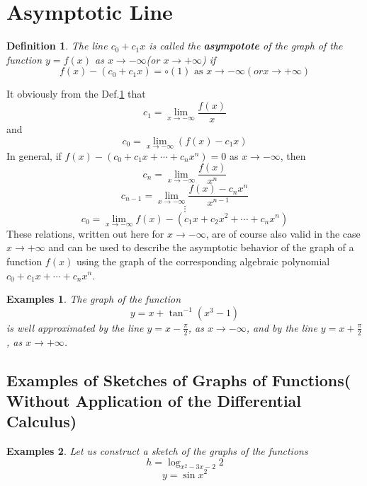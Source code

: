 \documentclass[a4paper,12pt]{article} %
\newtheorem{definition}{Definition}[section]
\newtheorem{example}{Examples}
\begin{document}
\section{Asymptotic Line}
\begin{definition}
    \normalfont 
    The line $c_0 + c_1x$ is called the \textbf{asympotote} of the graph of 
    the function $y = f(x)$ as $x \to -\infty$(or $x \to +\infty$) if 
    \[
        f(x) - (c_0 + c_1x) = \circ(1) \text{ as } x \to -\infty (or x \to +\infty)
        \]
    \label{def:def1}
\end{definition}
It obviously from the Def.\ref{def:def1} that 
\[
    c_1 = \lim_{x \to -\infty}\frac{f(x)}{x}
    \]
and 
\[
    c_0 = \lim_{x \to -\infty} \left(f(x) - c_1x\right)
    \]
In general, if $\displaystyle f(x) - (c_0 + c_1x + \cdots + c_nx^n) = 0$
as $x \to -\infty$, then 
\[
    c_n = \lim_{x \to -\infty}\frac{f(x)}{x^n}
    \]
\[
    c_{n-1} = \lim_{x \to -\infty} \frac{f(x) - c_nx^n}{x^{n-1}}
    \]
\[
    \vdots\]
\[
    c_0 = \lim_{x \to -\infty} f(x) - (c_1x + c_2x^2 + \cdots + c_nx^n)
    \]
These relations, written out here for $x \to -\infty$, are of course also 
valid in the case $x \to +\infty$ and can be used to describe the asymptotic 
behavior of the graph of a function $f(x)$ using the graph of the 
corresponding algebraic polynomial $c_0 + c_1x + \cdots + c_nx^n$.

\begin{example}
    \normalfont
    The graph of the function 
    \[
        y = x + \tan^{-1}(x^3 - 1)
        \]
    is well approximated by the line $y = x - \frac{\pi}{2}$,
    as $x \to -\infty$, and by the line $y = x + \frac{\pi}{2}$, as 
    $x \to +\infty$.
\end{example}

\subsection{Examples of Sketches of Graphs of Functions(
Without Application of the Differential Calculus)}
\begin{example}
    \normalfont
    Let us construct a sketch of the graphs of the functions 
    \[
        h = \log_{x^2-3x -2}2
        \]
    \[
        y = \sin x^2
        \]
\end{example}
\end{document}
